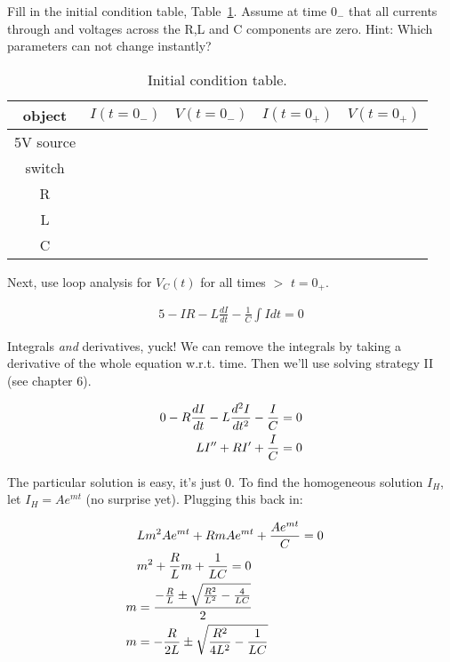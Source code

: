 \begin{clevel}
Fill in the initial condition table, Table~\ref{T:ic}. Assume at time $0_-$ that all currents through and voltages across the R,L and C components are zero. Hint: Which parameters can not change instantly?
\end{clevel}

\par
\begin{table}[H]
\begin{center}
\begin{tabular}{|c|c|c|c|c|} \hline
object	&$I(t=0_{-})$	&$V(t=0_{-})$	&$I(t=0_{+})$	&$V(t=0_{+})$ \\ \hline
5V source&&&& \\ \hline
switch&&&& \\ \hline
R&&&& \\ \hline
L&&&& \\ \hline
C&&&& \\ \hline
\end{tabular}
\caption{Initial condition table.}
\label{T:ic}
\end{center}
\end{table}

Next, use loop analysis for $V_C(t)$ for all times $>$ $t=0_+$.

\begin{align}
5 - IR - L\frac{dI}{dt} - \frac{1}{C}\int{Idt}=0
\end{align}

Integrals \emph{and} derivatives, yuck! We can remove the integrals by taking a derivative of the whole equation w.r.t. time. Then we'll use solving strategy II (see chapter 6).\par

\begin{align}
0 - R\frac{dI}{dt} - L\frac{d^2I}{dt^2} - \frac{I}{C}=0 \notag\\
LI''+RI'+\frac{I}{C}=0 \label{E:7RLC}
\end{align}

The particular solution is easy, it's just 0. To find the homogeneous solution $I_H$, let $I_H=Ae^{mt}$ (no surprise yet). Plugging this back in:

\begin{align}
&Lm^2Ae^{mt}+RmAe^{mt}+\frac{Ae^{mt}}{C}=0 \notag\\
&m^2+\frac{R}{L}m+\frac{1}{LC}=0 \notag\\
m&=\frac{-\frac{R}{L}\pm \sqrt{\frac{R^2}{L^2}-\frac{4}{LC}}}{2} \notag\\
m&=-\frac{R}{2L}\pm \sqrt{\frac{R^2}{4L^2}-\frac{1}{LC}} \label{E:6m} &
\end{align}


